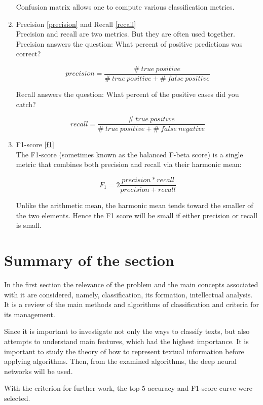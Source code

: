 \begin{enumerate}
\begin{figure}[ht]
	\end{figure}
	
	Confusion matrix allows one to compute various classification metrics.
	
	\item Precision \ref{precision} and Recall \ref{recall}\\
	Precision and recall are two metrics. But they are often used together.
	Precision answers the question: What percent of positive predictions was correct?
	
	\begin{equation}
	\label{precision}
	precision = {\frac{\#\ true\ positive}{\#\ true\ positive + \#\ false\ positive}}
	\end{equation}
\begin{doublespacing}
\end{doublespacing}
	
	Recall answers the question: What percent of the positive cases did you catch?
	
	\begin{equation}
	\label{recall}
	recall = {\frac{\#\ true\ positive}{\#\ true\ positive + \#\ false\ negative}}
	\end{equation}
\begin{doublespacing}
\end{doublespacing}
	
	\item F1-score \ref{f1}\\
	The F1-score (sometimes known as the balanced F-beta score) is a single metric that combines both precision and recall via their harmonic mean:
	
	\begin{equation}
	\label{f1}
	F_1 = 2 {\frac{precision * recall}{precision + recall}}
	\end{equation}
\begin{doublespacing}
\end{doublespacing}
	
	Unlike the arithmetic mean, the harmonic mean tends toward the smaller of the two elements. Hence the F1 score will be small if either precision or recall is small.
\end{enumerate}

\section{Summary of the section}

In the first section the relevance of the problem and the main concepts associated with it are considered, namely, classification, its formation, intellectual analysis. It is a review of the main methods and algorithms of classification and criteria for its management.

Since it is important to investigate not only the ways to classify texts, but also attempts to understand main features, which had the highest importance. It is important to study the theory of how to represent textual information before applying algorithms. Then, from the examined algorithms, the deep neural networks will be used. 

With the criterion for further work, the top-5 accuracy and F1-score curve were selected.

